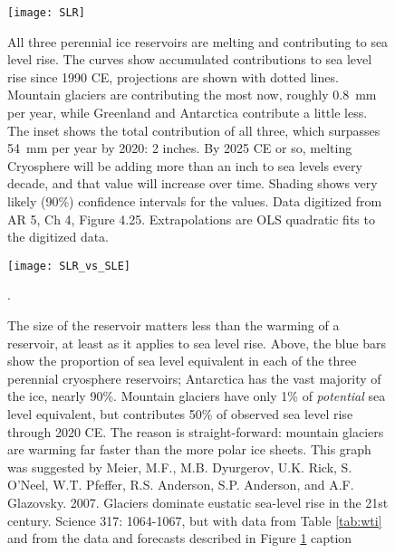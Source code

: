 \begin{figure}[p]
	\centering
  \texttt{[image: SLR]}%
	\caption{All three perennial ice reservoirs are melting and contributing to sea level rise. The curves show accumulated contributions to sea level rise since 1990 CE, projections are shown with dotted lines. Mountain glaciers are contributing the most now, roughly \SI{0.8}{\milli\metre} per year, while Greenland and Antarctica contribute a little less. The inset shows the total contribution of all three, which surpasses \SI{54}{\milli\metre} per year by 2020: 2 inches. By 2025 CE or so, melting Cryosphere will be adding more than an inch to sea levels every decade, and that value will increase over time. Shading shows very likely (90\%) confidence intervals for the values. Data digitized from AR 5, Ch 4, Figure 4.25. Extrapolations are OLS quadratic fits to the digitized data.}  
	\label{fig:SLR}
\end{figure}

\begin{figure}[p]
	\centering
  \texttt{[image: SLR\_vs\_SLE]}%
	\caption{The size of the reservoir matters less than the warming of a reservoir, at least as it applies to sea level rise. Above, the blue bars show the proportion of sea level equivalent in each of the three perennial cryosphere reservoirs; Antarctica has the vast majority of the ice, nearly 90\%. Mountain glaciers have only 1\% of \emph{potential} sea level equivalent, but contributes 50\% of observed sea level rise through 2020 CE. The reason is straight-forward: mountain glaciers are warming far faster than the more polar ice sheets. This graph was suggested by Meier, M.F., M.B. Dyurgerov, U.K. Rick, S. O'Neel, W.T. Pfeffer, R.S. Anderson, S.P. Anderson, and A.F. Glazovsky. 2007. Glaciers dominate eustatic sea-level rise in the 21st century. Science 317: 1064-1067, but with data from Table \ref{tab:wti} and from the data and forecasts described in Figure \ref{fig:SLR} caption}.   
	\label{fig:SLR_vs_SLE}
\end{figure}

